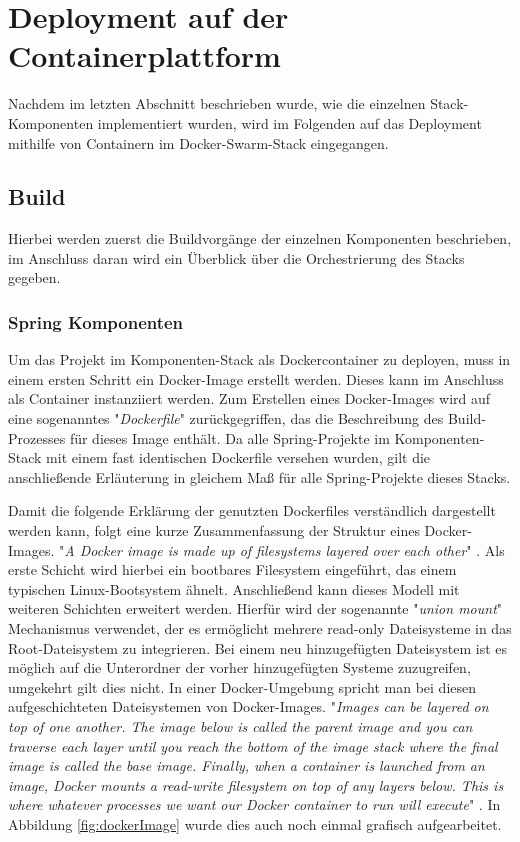 \section{Deployment auf der Containerplattform}
Nachdem im letzten Abschnitt beschrieben wurde, wie die einzelnen Stack-Komponenten implementiert wurden, wird im Folgenden auf das Deployment mithilfe von Containern im Docker-Swarm-Stack eingegangen. 

\subsection{Build}
Hierbei werden zuerst die Buildvorgänge der einzelnen Komponenten beschrieben, im Anschluss daran wird ein Überblick über die Orchestrierung des Stacks gegeben.

\subsubsection{Spring Komponenten}

Um das Projekt im Komponenten-Stack als Dockercontainer zu deployen, muss in einem ersten Schritt ein Docker-Image erstellt werden. Dieses kann im Anschluss als Container instanziiert werden. Zum Erstellen eines Docker-Images wird auf eine sogenanntes "\emph{Dockerfile}" zurückgegriffen, das die Beschreibung des Build-Prozesses für dieses Image enthält. Da alle Spring-Projekte im Komponenten-Stack mit einem fast identischen Dockerfile versehen wurden, gilt die anschließende Erläuterung in gleichem Maß für alle Spring-Projekte dieses Stacks.

Damit die folgende Erklärung der genutzten Dockerfiles verständlich dargestellt werden kann, folgt eine kurze Zusammenfassung der Struktur eines Docker-Images. "\emph{A Docker image is made up of filesystems layered over each other}" \cite[Seite~71]{turnbulldocker}. Als erste Schicht wird hierbei ein bootbares Filesystem eingeführt, das einem typischen Linux-Bootsystem ähnelt. Anschließend kann dieses Modell mit weiteren Schichten erweitert werden. Hierfür wird der sogenannte "\emph{union mount}" Mechanismus verwendet, der es ermöglicht mehrere read-only Dateisysteme in das Root-Dateisystem zu integrieren. Bei einem neu hinzugefügten Dateisystem ist es möglich auf die Unterordner der vorher hinzugefügten Systeme zuzugreifen, umgekehrt gilt dies nicht. In einer Docker-Umgebung spricht man bei diesen aufgeschichteten Dateisystemen von Docker-Images. "\emph{Images can be layered on top of one another.  The image below is called the parent image and you can traverse each layer until you reach the bottom of the image stack where the final image is called the base image.  Finally, when a container is launched from an image, Docker mounts a read-write filesystem on top of any layers below. This is where whatever processes we want our Docker container to run will execute}" \cite[Seite~71]{turnbulldocker}. In Abbildung \ref{fig:dockerImage}  wurde dies auch noch einmal grafisch aufgearbeitet.

